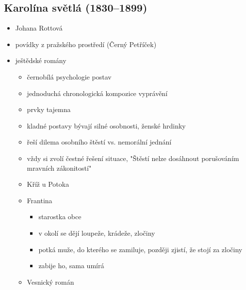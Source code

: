 \subsection{Karolína světlá (1830--1899)}
\begin{itemize}
\item Johana Rottová
\item povídky z pražského prostředí (Černý Petříček)
\item ještědské romány 
	\begin{itemize}
	\item černobílá psychologie postav
	\item jednoduchá chronologická kompozice vyprávění
	\item prvky tajemna
	\item kladné postavy bývají silné osobnosti, ženské hrdinky
	\item řeší dilema osobního štěstí vs. nemorální jednání
	\item vždy si zvolí čestné řešení situace, "Štěstí nelze dosáhnout porušováním mravních zákonitostí"
	\item Kříž u Potoka
	\item Frantina
		\begin{itemize}
		\item starostka obce
		\item v okolí se dějí loupeže, krádeže, zločiny
		\item potká muže, do kterého se zamiluje, později zjistí, že stojí za zločiny
		\item zabije ho, sama umírá
		\end{itemize}
	\item Vesnický román
	\end{itemize}
\end{itemize}

